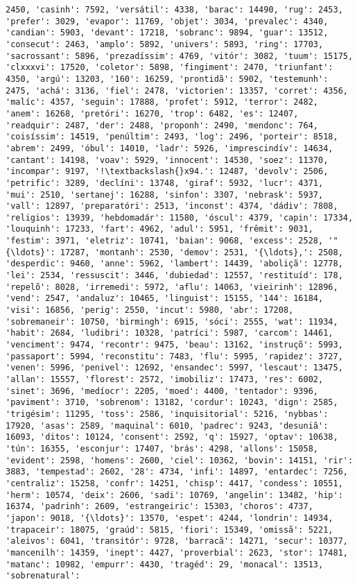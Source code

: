 \begin{Verbatim}[commandchars=\\\{\}]
2450, 'casinh': 7592, 'versátil': 4338, 'barac': 14490, 'rug': 2453, 'prefer': 3029, 'evapor': 11769, 'objet': 3034, 'prevalec': 4340, 'candian': 5903, 'devant': 17218, 'sobranc': 9894, 'guar': 13512, 'consecut': 2463, 'amplo': 5892, 'univers': 5893, 'ring': 17703, 'sacrossant': 5896, 'prezadíssim': 4769, 'vitór': 3082, 'tuum': 15175, 'clxxxvi': 17520, 'coletor': 5898, 'fingiment': 2470, 'triunfant': 4350, 'argú': 13203, '160': 16259, 'prontidã': 5902, 'testemunh': 2475, 'achá': 3136, 'fiel': 2478, 'victorien': 13357, 'corret': 4356, 'malíc': 4357, 'seguin': 17888, 'profet': 5912, 'terror': 2482, 'anem': 16268, 'pretóri': 16270, 'trop': 6482, 'es': 12407, 'readquir': 2487, 'der': 2488, 'proponh': 2490, 'mendonc': 764, 'coisíssim': 14519, 'penúltim': 2493, 'log': 2496, 'porteir': 8518, 'abrem': 2499, 'óbul': 14010, 'ladr': 5926, 'imprescindív': 14634, 'cantant': 14198, 'voav': 5929, 'innocent': 14530, 'soez': 11370, 'incompar': 9197, '!\textbackslash{}x94.': 12487, 'devolv': 2506, 'petrific': 3289, 'declíni': 13748, 'giraf': 5932, 'lucr': 4371, 'mui': 2510, 'sertanej': 16288, 'sinfon': 3307, 'nebrask': 5937, 'vall': 12897, 'preparatóri': 2513, 'inconst': 4374, 'dádiv': 7808, 'religios': 13939, 'hebdomadár': 11580, 'óscul': 4379, 'capin': 17334, 'louquinh': 17233, 'fart': 4962, 'adul': 5951, 'frêmit': 9031, 'festim': 3971, 'eletriz': 10741, 'baian': 9068, 'excess': 2528, '"{\ldots}': 17287, 'montanh': 2530, 'demov': 2531, '{\ldots},': 2508, 'desperdic': 9460, 'anne': 5962, 'lambert': 14439, 'aboliçã': 12778, 'lei': 2534, 'ressuscit': 3446, 'dubiedad': 12557, 'restituíd': 178, 'repelõ': 8028, 'irremedi': 5972, 'aflu': 14063, 'vieirinh': 12896, 'vend': 2547, 'andaluz': 10465, 'linguist': 15155, '144': 16184, 'visi': 16856, 'perig': 2550, 'incut': 5980, 'abr': 17208, 'sobremaneir': 10750, 'birmingh': 6915, 'sóci': 2555, 'wat': 11934, 'habit': 2684, 'ludibri': 10328, 'patríci': 5987, 'carcom': 14461, 'venciment': 9474, 'recontr': 9475, 'beau': 13162, 'instruçõ': 5993, 'passaport': 5994, 'reconstitu': 7483, 'flu': 5995, 'rapidez': 3727, 'venen': 5996, 'penivel': 12692, 'ensandec': 5997, 'lescaut': 13475, 'allan': 15557, 'florest': 2572, 'imobiliz': 17473, 'res': 6002, 'sinet': 3696, 'medíocr': 2205, 'moed': 4400, 'tentador': 9396, 'paviment': 3710, 'sobrenom': 13182, 'cordur': 10243, 'dign': 2585, 'trigésim': 11295, 'toss': 2586, 'inquisitorial': 5216, 'nybbas': 17920, 'asas': 2589, 'maquinal': 6010, 'padrec': 9243, 'desuniã': 16093, 'ditos': 10124, 'consent': 2592, 'q': 15927, 'optav': 10638, 'tún': 16355, 'esconjur': 17407, 'brás': 4298, 'allons': 15058, 'evident': 2598, 'homens': 2600, 'ciel': 10362, 'bovin': 14151, 'rir': 3883, 'tempestad': 2602, '28': 4734, 'infi': 14897, 'entardec': 7256, 'centraliz': 15258, 'confr': 14251, 'chisp': 4417, 'condess': 10551, 'herm': 10574, 'deix': 2606, 'sadi': 10769, 'angelin': 13482, 'hip': 16374, 'padrinh': 2609, 'estrangeiric': 15303, 'choros': 4737, 'japon': 9018, '{\ldots}': 13570, 'espet': 4244, 'londrin': 14934, 'trapaceir': 18075, 'graúd': 5815, 'fiori': 15349, 'omissã': 5221, 'aleivos': 6041, 'transitór': 9728, 'barracã': 14271, 'secur': 10377, 'mancenilh': 14359, 'inept': 4427, 'proverbial': 2623, 'stor': 17481, 'matanc': 10982, 'empurr': 4430, 'tragéd': 29, 'monacal': 13513, 'sobrenatural': 
\end{Verbatim}
